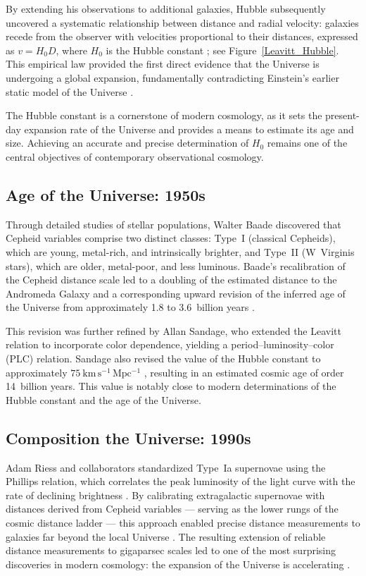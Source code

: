 By extending his observations to additional galaxies, Hubble subsequently uncovered a systematic relationship between distance and radial velocity: galaxies recede from the observer with velocities proportional to their distances, expressed as $v = H_0 D$, where $H_0$ is the Hubble constant \citep{1929hubble}; see Figure~\ref{Leavitt_Hubble}. This empirical law provided the first direct evidence that the Universe is undergoing a global expansion, fundamentally contradicting Einstein’s earlier static model of the Universe \citep{1917einstein}.

The Hubble constant is a cornerstone of modern cosmology, as it sets the present-day expansion rate of the Universe and provides a means to estimate its age and size. Achieving an accurate and precise determination of $H_0$ remains one of the central objectives of contemporary observational cosmology.


\subsection{Age of the Universe: 1950s}

Through detailed studies of stellar populations, Walter Baade discovered that Cepheid variables comprise two distinct classes: Type~I (classical Cepheids), which are young, metal-rich, and intrinsically brighter, and Type~II (W~Virginis stars), which are older, metal-poor, and less luminous. Baade’s recalibration of the Cepheid distance scale led to a doubling of the estimated distance to the Andromeda Galaxy and a corresponding upward revision of the inferred age of the Universe from approximately 1.8 to 3.6~billion years \citep{1958baade}.

This revision was further refined by Allan Sandage, who extended the Leavitt relation to incorporate color dependence, yielding a period--luminosity--color (PLC) relation. Sandage also revised the value of the Hubble constant to approximately $75~\mathrm{km\,s^{-1}\,Mpc^{-1}}$ \citep{1958sandage}, resulting in an estimated cosmic age of order 14~billion years. This value is notably close to modern determinations of the Hubble constant and the age of the Universe.


\subsection{Composition the Universe: 1990s}


Adam Riess and collaborators \citep{Riess1996} standardized Type~Ia supernovae using the Phillips relation, which correlates the peak luminosity of the light curve with the rate of declining brightness \citep{1993phillips}. By calibrating extragalactic supernovae with distances derived from Cepheid variables — serving as the lower rungs of the cosmic distance ladder — this approach enabled precise distance measurements to galaxies far beyond the local Universe \citep{Riess1998, Schmidt1998}. The resulting extension of reliable distance measurements to gigaparsec scales led to one of the most surprising discoveries in modern cosmology: the expansion of the Universe is accelerating \citep{Riess1998, Perlmutter1999}. 

